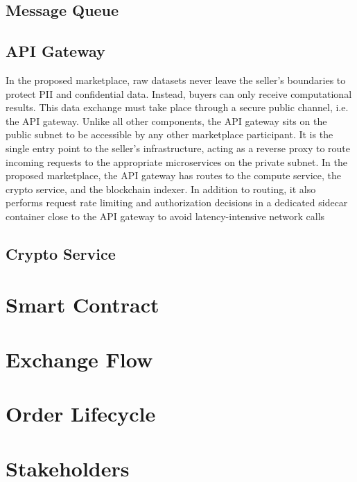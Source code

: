 \subsection{Message Queue}
\label{subsec:mq}

\subsection{API Gateway}
\label{subsec:api_gw}

In the proposed marketplace, raw datasets never leave the seller's boundaries to protect PII and confidential data. Instead, buyers can only receive computational results. This data exchange must take place through a secure public channel, i.e. the API gateway. Unlike all other components, the API gateway sits on the public subnet to be accessible by any other marketplace participant. It is the single entry point to the seller's infrastructure, acting as a reverse proxy to route incoming requests to the appropriate microservices on the private subnet. In the proposed marketplace, the API gateway has routes to the compute service, the crypto service, and the blockchain indexer. In addition to routing, it also performs request rate limiting and authorization decisions in a dedicated sidecar container close to the API gateway to avoid latency-intensive network calls

\subsection{Crypto Service}
\label{subsec:crypto}

\section{Smart Contract}
\label{section:smart contract}

\section{Exchange Flow}
\label{section:exchange}

\section{Order Lifecycle}
\label{section:lifecycle}

\section{Stakeholders}
\label{section:stakeholders}

